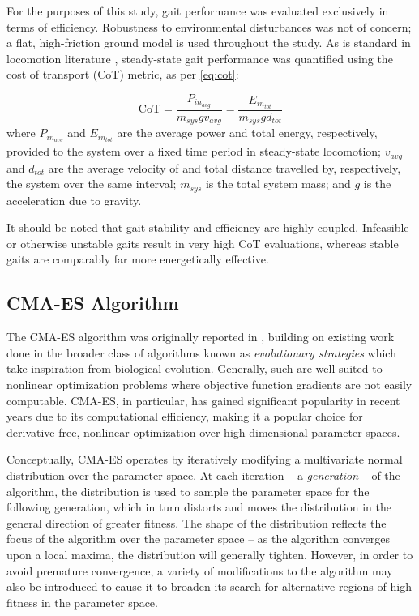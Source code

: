 \documentclass[conference,11pt,letterpaper]{IEEEtran}
\begin{document}
For the purposes of this study, gait performance was evaluated exclusively in terms of efficiency. Robustness to environmental disturbances was not of concern; a flat, high-friction ground model is used throughout the study. As is standard in locomotion literature \autocite{von1950price}, steady-state gait performance was quantified using the cost of transport (CoT) metric, as per \cref{eq:cot}:

    \begin{equation} \label{eq:cot}
        \text{CoT} = \frac{P_{in_{avg}}}{m_{sys}gv_{avg}} = \frac{E_{in_{tot}}}{m_{sys}gd_{tot}}
    \end{equation}
where $P_{in_{avg}}$ and $E_{in_{tot}}$ are the average power and total energy, respectively, provided to the system over a fixed time period in steady-state locomotion; $v_{avg}$ and $d_{tot}$ are the average velocity of and total distance travelled by, respectively, the system over the same interval; $m_{sys}$ is the total system mass; and $g$ is the acceleration due to gravity.

It should be noted that gait stability and efficiency are highly coupled. Infeasible or otherwise unstable gaits result in very high CoT evaluations, whereas stable gaits are comparably far more energetically effective.

\subsection{CMA-ES Algorithm} \label{sec:cmaes}

	The CMA-ES algorithm was originally reported in \autocite{hansen2001}, building on existing work done in the broader class of algorithms known as \emph{evolutionary strategies} which take inspiration from biological evolution. Generally, such are well suited to nonlinear optimization problems where objective function gradients are not easily computable. CMA-ES, in particular, has gained significant popularity in recent years due to its computational efficiency, making it a popular choice for derivative-free, nonlinear optimization over high-dimensional parameter spaces. 
	
	Conceptually, CMA-ES operates by iteratively modifying a multivariate normal distribution over the parameter space. At each iteration -- a \emph{generation} -- of the algorithm, the distribution is used to sample the parameter space for the following generation, which in turn distorts and moves the distribution in the general direction of greater fitness. The shape of the distribution reflects the focus of the algorithm over the parameter space -- as the algorithm converges upon a local maxima, the distribution will generally tighten. However, in order to avoid premature convergence, a variety of modifications to the algorithm may also be introduced to cause it to broaden its search for alternative regions of high fitness in the parameter space.
	
\end{document}
